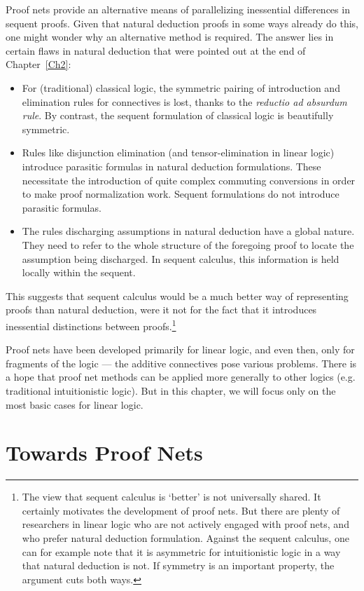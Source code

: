Proof nets provide an alternative means of parallelizing inessential 
differences in sequent proofs.   Given that natural deduction proofs in
some ways already do this, one might wonder why an alternative method
is required.  The answer lies in certain flaws in natural deduction
that were pointed out at the end of Chapter~\ref{Ch2}:
\begin{itemize}
\item For (traditional) classical logic, the symmetric pairing of
introduction and elimination rules for connectives is lost, thanks
to the {\it reductio ad absurdum rule}.  By contrast, the sequent
formulation of classical logic is beautifully symmetric.
\item Rules like disjunction elimination (and tensor-elimination in linear
logic) introduce parasitic formulas in natural deduction formulations.
These necessitate the introduction of quite complex commuting conversions
in order to make proof normalization work.  Sequent formulations
do not introduce parasitic formulas.
\item The rules discharging assumptions in natural deduction have a global
nature.  They need to refer to the whole structure of the foregoing proof
to locate the assumption being discharged.  In sequent calculus, this 
information is held locally within the sequent.
\end{itemize}
This suggests that sequent calculus would be a much better way of
representing proofs than natural deduction, were it not for the fact that
it introduces inessential distinctions between proofs.\footnote{The view
that sequent calculus is `better' is not universally shared.  It certainly
motivates the development of proof nets.  But there are plenty of researchers
in linear logic who are not actively engaged with proof nets, and who
prefer natural deduction formulation.  Against the sequent calculus, one
can for example note that it is asymmetric for intuitionistic logic in a
way that natural deduction is not.  If symmetry is an important property,
the argument cuts both ways.}

Proof nets have been developed primarily for linear logic, and even then,
only for fragments of the logic --- the additive connectives pose various
problems.  There is a hope that proof net methods can be applied
more generally to other logics (e.g. traditional  intuitionistic
logic). But in this chapter, we will focus only on the most basic cases for
linear logic.

\section{Towards Proof Nets}


